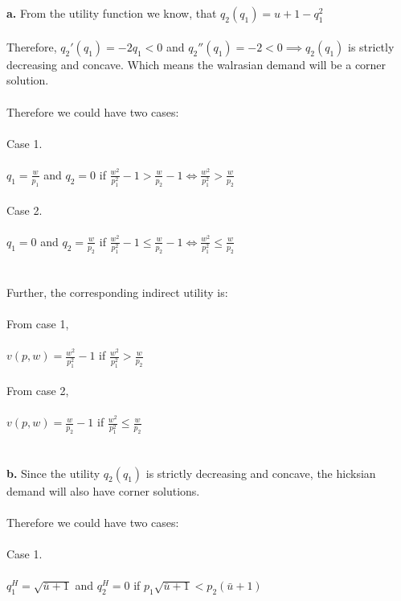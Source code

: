 \documentclass[12pt]{article}
\newenvironment{problem}[2][Problem]{\begin{trivlist}
\item[\hskip \labelsep {\bfseries #1}\hskip \labelsep {\bfseries #2.}]}{\end{trivlist}}
\newcommand\ddfrac[2]{\frac{\displaystyle #1}{\displaystyle #2}}
\begin{document}
\begin{problem}{4}.
 \\ \\
\textbf{a.} From the utility function we know, that $q_2(q_1) =  u + 1 -  q_1^2$
\\
\\
Therefore, $q_2'(q_1) = - 2 q_1 < 0$ and $q_2''(q_1) = - 2 < 0 \implies q_2(q_1)$ is strictly decreasing and concave. Which means the walrasian demand will be a corner solution. 
\\
\\
Therefore we could have two cases:
\\
\\
Case 1. 
\\
\\
$q_1 = \ddfrac{w}{p_1}  $ and $q_2 = 0 $ if $ \ddfrac{w^2}{p_1^2} -1 > \ddfrac{w}{p_2} -1\iff \ddfrac{w^2}{p_1^2} > \ddfrac{w}{p_2}$
\\
\\
Case 2. 
\\
\\
$q_1 = 0 $ and $q_2 = \ddfrac{w}{p_2}  $ if $ \ddfrac{w^2}{p_1^2} -1 \leq \ddfrac{w}{p_2} -1\iff \ddfrac{w^2}{p_1^2} \leq \ddfrac{w}{p_2}$
\\
\\
\\
Further, the corresponding indirect utility is:
\\
\\
From case 1,
\\
\\
$v(p,w) = \ddfrac{w^2}{p_1^2} -1 $ if $ \ddfrac{w^2}{p_1^2} > \ddfrac{w}{p_2}$
\\
\\
From case 2,
\\
\\
$v(p,w) = \ddfrac{w}{p_2} -1 $ if $ \ddfrac{w^2}{p_1^2} \leq \ddfrac{w}{p_2}$
\\
\\
\\
\textbf{b.} Since the utility $q_2(q_1)  $ is strictly decreasing and concave, the hicksian demand will also have corner solutions. 
\\
\\
Therefore we could have two cases:
\\
\\
Case 1. 
\\
\\
$q_1^H = \sqrt{\bar{u} +1}   $ and $q_2^H = 0 $ if $ p_1\sqrt{\bar{u} +1} < p_2 ( \bar{u} +1)$

\end{problem}
\end{document}
